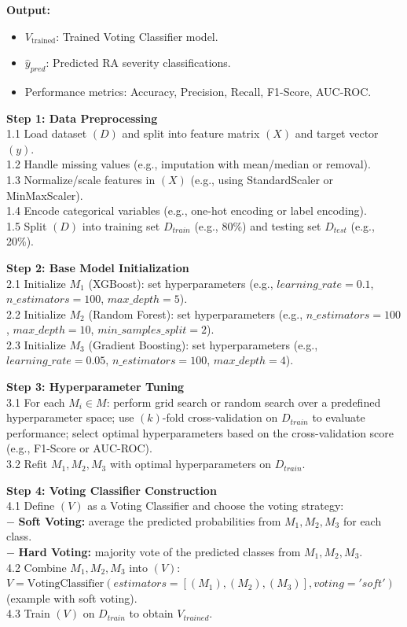\documentclass[10pt]{NSP1}
\begin{document}
	\noindent\textbf{Output:}
	\begin{itemize}
		\item $V_{\text{trained}}$: Trained Voting Classifier model.
		\item $\hat{y}_{pred}$: Predicted RA severity classifications.
		\item Performance metrics: Accuracy, Precision, Recall, F1-Score, AUC-ROC.
	\end{itemize}
	
	\noindent\textbf{Step 1: Data Preprocessing}\\
	1.1 Load dataset $(D)$ and split into feature matrix $(X)$ and target vector $(y)$.\\
	1.2 Handle missing values (e.g., imputation with mean/median or removal).\\
	1.3 Normalize/scale features in $(X)$ (e.g., using StandardScaler or MinMaxScaler).\\
	1.4 Encode categorical variables (e.g., one-hot encoding or label encoding).\\
	1.5 Split $(D)$ into training set $D_{train}$ (e.g., 80\%) and testing set $D_{test}$ (e.g., 20\%).
	
	\noindent\textbf{Step 2: Base Model Initialization}\\
	2.1 Initialize $M_1$ (XGBoost): set hyperparameters (e.g., $learning\_rate = 0.1$, $n\_estimators = 100$, $max\_depth = 5$).\\
	2.2 Initialize $M_2$ (Random Forest): set hyperparameters (e.g., $n\_estimators = 100$, $max\_depth = 10$, $min\_samples\_split = 2$).\\
	2.3 Initialize $M_3$ (Gradient Boosting): set hyperparameters (e.g., $learning\_rate = 0.05$, $n\_estimators = 100$, $max\_depth = 4$).
	
	\noindent\textbf{Step 3: Hyperparameter Tuning}\\
	3.1 For each $M_i \in M$: perform grid search or random search over a predefined hyperparameter space; use $(k)$-fold cross-validation on $D_{train}$ to evaluate performance; select optimal hyperparameters based on the cross-validation score (e.g., F1-Score or AUC-ROC).\\
	3.2 Refit $M_1, M_2, M_3$ with optimal hyperparameters on $D_{train}$.
	
	\noindent\textbf{Step 4: Voting Classifier Construction}\\
	4.1 Define $(V)$ as a Voting Classifier and choose the voting strategy:\\
	$-$ \textbf{Soft Voting:} average the predicted probabilities from $M_1, M_2, M_3$ for each class.\\
	$-$ \textbf{Hard Voting:} majority vote of the predicted classes from $M_1, M_2, M_3$.\\
	4.2 Combine $M_1, M_2, M_3$ into $(V)$: $V = \text{VotingClassifier}(estimators=[(M_1), (M_2), (M_3)], voting='soft')$ (example with soft voting).\\
	4.3 Train $(V)$ on $D_{train}$ to obtain $V_{trained}$.
	
\end{document}

